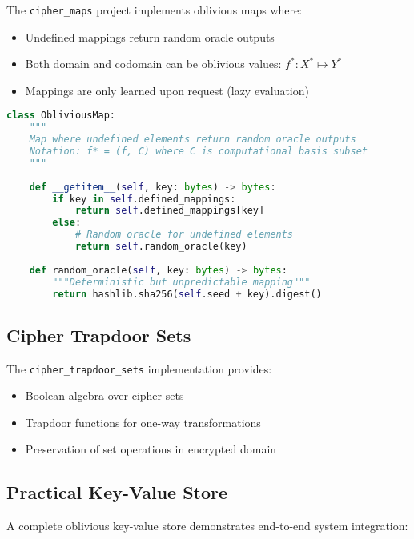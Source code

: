 The \texttt{cipher\_maps} project implements oblivious maps where:
\begin{itemize}
\item Undefined mappings return random oracle outputs
\item Both domain and codomain can be oblivious values: $f^* : X^* \mapsto Y^*$
\item Mappings are only learned upon request (lazy evaluation)
\end{itemize}

\begin{lstlisting}[language=Python, caption={Oblivious map with random oracle for undefined elements}]
class ObliviousMap:
    """
    Map where undefined elements return random oracle outputs
    Notation: f* = (f, C) where C is computational basis subset
    """
    
    def __getitem__(self, key: bytes) -> bytes:
        if key in self.defined_mappings:
            return self.defined_mappings[key]
        else:
            # Random oracle for undefined elements
            return self.random_oracle(key)
    
    def random_oracle(self, key: bytes) -> bytes:
        """Deterministic but unpredictable mapping"""
        return hashlib.sha256(self.seed + key).digest()
\end{lstlisting}

\subsection{Cipher Trapdoor Sets}

The \texttt{cipher\_trapdoor\_sets} implementation provides:
\begin{itemize}
\item Boolean algebra over cipher sets
\item Trapdoor functions for one-way transformations
\item Preservation of set operations in encrypted domain
\end{itemize}

\subsection{Practical Key-Value Store}

A complete oblivious key-value store demonstrates end-to-end system integration:

